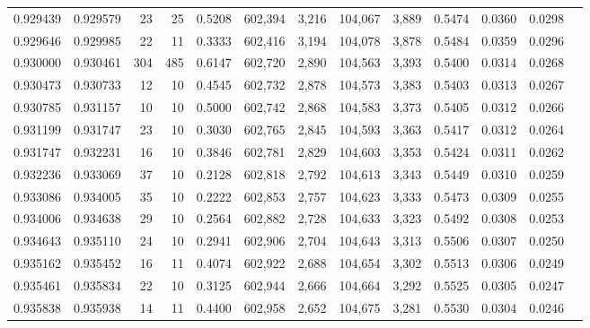 \begin{tabular}{rrrrrrrrrrrrr}
0.929439 & 0.929579 &    23 &  25 &                                     0.5208 & 602,394 &   3,216 & 104,067 &   3,889 & 0.5474 & 0.0360 & 0.0298 \\
0.929646 & 0.929985 &    22 &  11 &                                     0.3333 & 602,416 &   3,194 & 104,078 &   3,878 & 0.5484 & 0.0359 & 0.0296 \\
0.930000 & 0.930461 &   304 & 485 &                                     0.6147 & 602,720 &   2,890 & 104,563 &   3,393 & 0.5400 & 0.0314 & 0.0268 \\
0.930473 & 0.930733 &    12 &  10 &                                     0.4545 & 602,732 &   2,878 & 104,573 &   3,383 & 0.5403 & 0.0313 & 0.0267 \\
0.930785 & 0.931157 &    10 &  10 &                                     0.5000 & 602,742 &   2,868 & 104,583 &   3,373 & 0.5405 & 0.0312 & 0.0266 \\
0.931199 & 0.931747 &    23 &  10 &                                     0.3030 & 602,765 &   2,845 & 104,593 &   3,363 & 0.5417 & 0.0312 & 0.0264 \\
0.931747 & 0.932231 &    16 &  10 &                                     0.3846 & 602,781 &   2,829 & 104,603 &   3,353 & 0.5424 & 0.0311 & 0.0262 \\
0.932236 & 0.933069 &    37 &  10 &                                     0.2128 & 602,818 &   2,792 & 104,613 &   3,343 & 0.5449 & 0.0310 & 0.0259 \\
0.933086 & 0.934005 &    35 &  10 &                                     0.2222 & 602,853 &   2,757 & 104,623 &   3,333 & 0.5473 & 0.0309 & 0.0255 \\
0.934006 & 0.934638 &    29 &  10 &                                     0.2564 & 602,882 &   2,728 & 104,633 &   3,323 & 0.5492 & 0.0308 & 0.0253 \\
0.934643 & 0.935110 &    24 &  10 &                                     0.2941 & 602,906 &   2,704 & 104,643 &   3,313 & 0.5506 & 0.0307 & 0.0250 \\
0.935162 & 0.935452 &    16 &  11 &                                     0.4074 & 602,922 &   2,688 & 104,654 &   3,302 & 0.5513 & 0.0306 & 0.0249 \\
0.935461 & 0.935834 &    22 &  10 &                                     0.3125 & 602,944 &   2,666 & 104,664 &   3,292 & 0.5525 & 0.0305 & 0.0247 \\
0.935838 & 0.935938 &    14 &  11 &                                     0.4400 & 602,958 &   2,652 & 104,675 &   3,281 & 0.5530 & 0.0304 & 0.0246 \\

\end{tabular}
